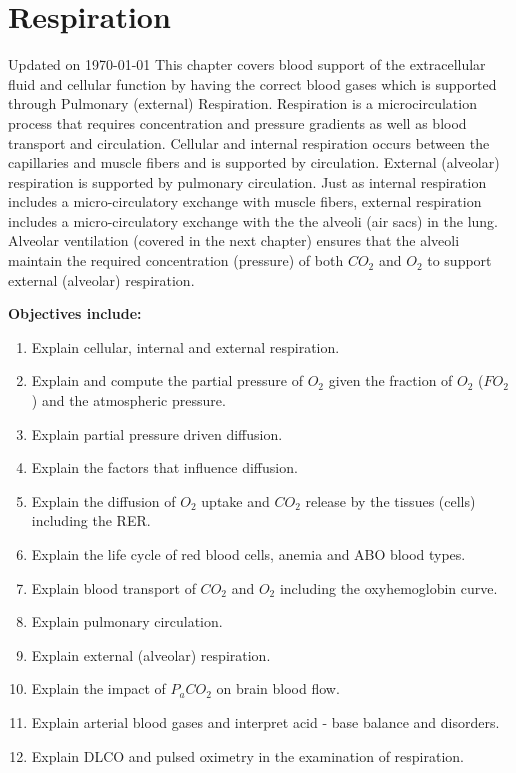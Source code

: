 \chapter{Respiration}\label{chp:blood_oxygen}
Updated on \today
\minitoc
This chapter covers blood support of the extracellular fluid and cellular function by having the correct blood gases which is supported through Pulmonary (external) Respiration. Respiration is a microcirculation process that requires concentration and pressure gradients as well as blood transport and circulation. Cellular and internal respiration occurs between the capillaries and muscle fibers and is supported by circulation. External (alveolar) respiration is supported by pulmonary circulation. Just as internal respiration includes a micro-circulatory exchange with muscle fibers, external respiration includes a micro-circulatory exchange with the the alveoli (air sacs) in the lung. Alveolar ventilation (covered in the next chapter) ensures that the alveoli maintain the required concentration (pressure) of both $CO_2$ and $O_2$ to support external (alveolar) respiration.

\vspace{5mm}

\textbf{Objectives include:}
\begin{enumerate}
    \item Explain cellular, internal and external respiration.
    \item Explain and compute the partial pressure of $O_2$ given the fraction of $O_2$ ($FO_2$) and the atmospheric pressure.
    \item Explain partial pressure driven diffusion.
    \item Explain the factors that influence diffusion.
    \item Explain the diffusion of $O_2$ uptake and $CO_2$ release by the tissues (cells) including the RER.
    \item Explain the life cycle of red blood cells, anemia and ABO blood types.
    \item Explain blood transport of $CO_2$ and $O_2$ including the oxyhemoglobin curve.
    \item Explain pulmonary circulation.
    \item Explain external (alveolar) respiration.
    \item Explain the impact of $P_aCO_2$ on brain blood flow.
    \item Explain arterial blood gases and interpret acid - base balance and disorders.
    \item Explain DLCO and pulsed oximetry in the examination of respiration.
\end{enumerate}

